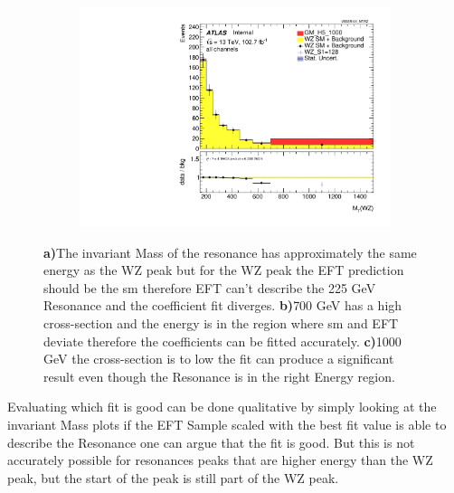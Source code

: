 \documentclass[../Bachelorarbeit.tex]{subfiles}
\begin{document}
\begin{figure}[h]
\begin{subfigure}{0.3\textwidth}
        \caption{}
    \end{subfigure}
    \begin{subfigure}{0.3\textwidth}
        \includegraphics[width=\textwidth]{Plots/operators/all_VV_MTWZ_1000.pdf}
        \caption{}
    \end{subfigure}
    \caption{\textbf{a)}The invariant Mass of the resonance has approximately the same energy as the WZ peak but for the WZ peak the EFT prediction
        should be the \acrshort{sm} therefore EFT can't describe the 225 GeV Resonance and the coefficient fit diverges.
        \textbf{b)}700 GeV has a high cross-section and the energy is in the region where \acrshort{sm} and EFT deviate therefore the coefficients can be fitted accurately.
        \textbf{c)}1000 GeV the cross-section is to low the fit can produce a significant result even though the Resonance is in the right Energy region.}
    \label{fig:S1_with_fit_diffrence_225}
\end{figure}
Evaluating which fit is good can be done qualitative by simply looking at the invariant Mass plots if the EFT Sample scaled with the best fit value is able to describe
the Resonance one can argue that the fit is good. But this is not accurately possible for resonances peaks that are higher energy than the WZ peak, but the start of the peak is still part of the WZ peak.\\\\
\end{document}
